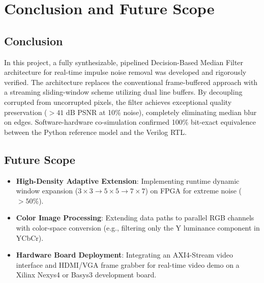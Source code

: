 \documentclass[12pt,a4paper]{article}
\begin{document}
\section{Conclusion and Future Scope}

\subsection{Conclusion}
In this project, a fully synthesizable, pipelined Decision-Based Median Filter architecture for real-time impulse noise removal was developed and rigorously verified. The architecture replaces the conventional frame-buffered approach with a streaming sliding-window scheme utilizing dual line buffers. By decoupling corrupted from uncorrupted pixels, the filter achieves exceptional quality preservation ($>41\text{ dB}$ PSNR at 10\% noise), completely eliminating median blur on edges. Software-hardware co-simulation confirmed 100\% bit-exact equivalence between the Python reference model and the Verilog RTL.

\subsection{Future Scope}
\begin{itemize}
    \item \textbf{High-Density Adaptive Extension}: Implementing runtime dynamic window expansion ($3\times 3 \to 5\times 5 \to 7\times 7$) on FPGA for extreme noise ($>50\%$).
    \item \textbf{Color Image Processing}: Extending data paths to parallel RGB channels with color-space conversion (e.g., filtering only the Y luminance component in YCbCr).
    \item \textbf{Hardware Board Deployment}: Integrating an AXI4-Stream video interface and HDMI/VGA frame grabber for real-time video demo on a Xilinx Nexys4 or Basys3 development board.
\end{itemize}
\end{document}
